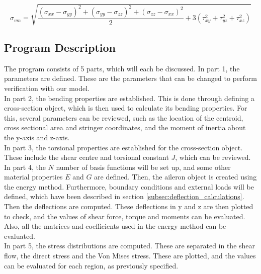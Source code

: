 \begin{equation}\label{eq:vonmises}
\sigma_{vm} = \sqrt{\frac{(\sigma_{xx}-\sigma_{yy})^2+(\sigma_{yy}-\sigma_{zz})^2+(\sigma_{zz}-\sigma_{xx})^2}{2} + 3 (\tau_{xy}^2+\tau_{yz}^2+\tau_{xz}^2)}
\end{equation}

\subsection{Program Description}
The program consists of 5 parts, which will each be discussed. 
In part 1, the parameters are defined. These are the parameters that can be changed to perform verification with our model. \\
In part 2, the bending properties are established. This is done through defining a cross-section object, which is then used to calculate its bending properties. For this, several parameters can be reviewed, such as the location of the centroid, cross sectional area and stringer coordinates, and the moment of inertia about the y-axis and z-axis.\\
In part 3, the torsional properties are established for the cross-section object. These include the shear centre and torsional constant $J$, which can be reviewed. \\
In part 4, the $N$ number of basis functions will be set up, and some other material properties $E$ and $G$ are defined. Then, the aileron object is created using the energy method. Furthermore, boundary conditions and external loads will be defined, which have been described in section \ref{subsec:deflection_calculations}. Then the deflections are computed. These deflections in y and z are then plotted to check, and the values of shear force, torque and moments can be evaluated. Also, all the matrices and coefficients used in the energy method can be evaluated.\\
In part 5, the stress distributions are computed. These are separated in the shear flow, the direct stress and the Von Mises stress. These are plotted, and the values can be evaluated for each region, as previously specified.